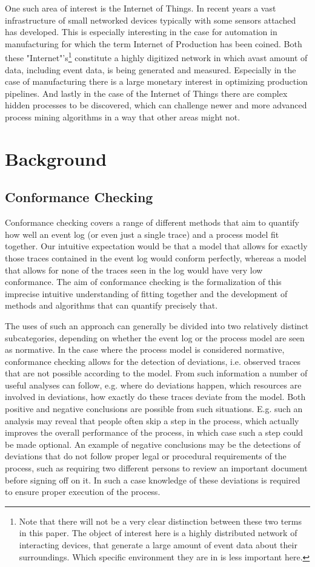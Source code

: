 \documentclass[runningheads]{template/llncs}
\begin{document}
One such area of interest is the Internet of Things.
In recent years a vast infrastructure of small networked devices typically with some sensors attached has developed. 
This is especially interesting in the case for automation in manufacturing for which the term Internet of Production has been coined.
Both these "Internet"'s\footnote{Note that there will not be a very clear distinction between these two terms in this paper. The object of interest here is a highly distributed network of interacting devices, that generate a large amount of event data about their surroundings. Which specific environment they are in is less important here.} 
constitute a highly digitized network in which avast amount of data, including event data, is being generated and measured.
Especially in the case of manufacturing there is a large monetary interest in optimizing production pipelines.
And lastly in the case of the Internet of Things there are complex hidden processes to be discovered, which can challenge newer and more advanced process mining algorithms in a way that other areas might not.
\section{Background}
\subsection{Conformance Checking}
Conformance checking covers a range of different methods that aim to quantify how well an event log (or even just a single trace) and a process model fit together.
Our intuitive expectation would be that a model that allows for exactly those traces contained in the event log would conform perfectly, whereas a model that allows for none of the traces seen in the log would have very low conformance.
The aim of conformance checking is the formalization of this imprecise intuitive understanding of fitting together and the development of methods and algorithms that can quantify precisely that.

The uses of such an approach can generally be divided into two relatively distinct subcategories, depending on whether the event log or the process model are seen as normative.
In the case where the process model is considered normative, conformance checking allows for the detection of deviations, i.e. observed traces that are not possible according to the model.
From such information a number of useful analyses can follow, e.g. where do deviations happen, which resources are involved in deviations, how exactly do these traces deviate from the model.
Both positive and negative conclusions are possible from such situations.
E.g. such an analysis may reveal that people often skip a step in the process, which actually improves the overall performance of the process, in which case such a step could be made optional.
An example of negative conclusions may be the detections of deviations that do not follow proper legal or procedural requirements of the process, such as requiring two different persons to review an important document before signing off on it. In such a case knowledge of these deviations is required to ensure proper execution of the process.
\end{document}
